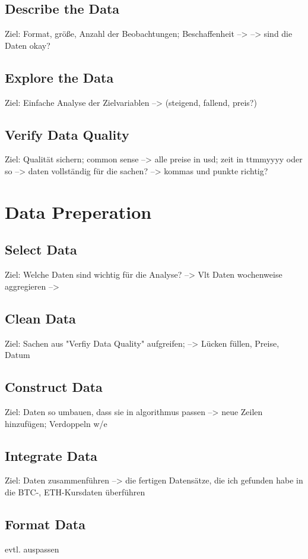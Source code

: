 \subsection{Describe the Data}
Ziel: Format, größe, Anzahl der Beobachtungen; Beschaffenheit
-->
--> sind die Daten okay? 

\subsection{Explore the Data}
Ziel: Einfache Analyse der Zielvariablen 
--> (steigend, fallend, preis?)

\subsection{Verify Data Quality}
Ziel: Qualität sichern; common sense
--> alle preise in usd; zeit in ttmmyyyy oder so
--> daten vollständig für die sachen?
--> kommas und punkte richtig?

\section{Data Preperation}
\subsection{Select Data}
Ziel: Welche Daten sind wichtig für die Analyse?
--> Vlt Daten wochenweise aggregieren
--> 

\subsection{Clean Data}
Ziel: Sachen aus "Verfiy Data Quality" aufgreifen;
--> Lücken füllen, Preise, Datum

\subsection{Construct Data}
Ziel: Daten so umbauen, dass sie in algorithmus passen
--> neue Zeilen hinzufügen; Verdoppeln w/e

\subsection{Integrate Data}
Ziel: Daten zusammenführen
--> die fertigen Datensätze, die ich gefunden habe in die BTC-, ETH-Kursdaten überführen

\subsection{Format Data}
evtl. auspassen

